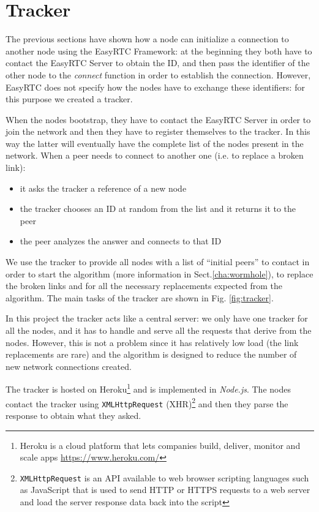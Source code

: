\chapter{Tracker}
\label{cha:tracker}

The previous sections have shown how a node can initialize a connection to another node using the EasyRTC Framework: at the beginning they both have to contact the EasyRTC Server to obtain the ID, and then pass the identifier of the other node to the \textit{connect} function in order to establish the connection. However, EasyRTC does not specify how the nodes have to exchange these identifiers: for this purpose we created a tracker. 

When the nodes bootstrap, they have to contact the EasyRTC Server in order to join the network and then they have to register themselves to the tracker. In this way the latter will eventually have the complete list of the nodes present in the network. When a peer needs to connect to another one (i.e. to replace a broken link):
\begin{itemize}
	\item it asks the tracker a reference of a new node
	\item the tracker chooses an ID at random from the list and it returns it to the peer
	\item the peer analyzes the answer and connects to that ID
\end{itemize}

We use the tracker to provide all nodes with a list of ``initial peers'' to contact in order to start the algorithm (more information in Sect.\ref{cha:wormhole}), to replace the broken links and for all the necessary replacements expected from the algorithm. The main tasks of the tracker are shown in Fig. \ref{fig:tracker}.

In this project the tracker acts like a central server: we only have one tracker for all the nodes, and it has to handle and serve all the requests that derive from the nodes. However, this is not a problem since it has relatively low load (the link replacements are rare) and the algorithm is designed to reduce the number of new network connections created. 

The tracker is hosted on Heroku\footnote{Heroku is a cloud platform that lets companies build, deliver, monitor and scale apps \url{https://www.heroku.com/}} and is implemented in \textit{Node.js}. The nodes contact the tracker using \texttt{XMLHttpRequest} (XHR)\footnote{\texttt{XMLHttpRequest} is an API available to web browser scripting languages such as JavaScript that is used to send HTTP or HTTPS requests to a web server and load the server response data back into the script} and then they parse the response to obtain what they asked.

